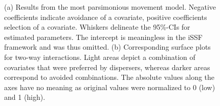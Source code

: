 \documentclass[abstract=on,10pt,a4paper,bibliography=totocnumbered]{scrartcl}
\begin{document}
\begin{figure}[hbtp]
  \begin{center}
    \caption{(a) Results from the most parsimonious movement model. Negative
    coefficients indicate avoidance of a covariate, positive coefficients
    selection of a covariate. Whiskers delineate the 95\%-CIs for estimated
    parameters. The intercept is meaningless in the iSSF framework and was thus
    omitted. (b) Corresponding surface plots for two-way interactions. Light
    areas depict a combination of covariates that were preferred by dispersers,
    whereas darker areas correspond to avoided combinations. The absolute values
    along the axes have no meaning as original values were normalized to 0 (low)
    and 1 (high).}
    \label{MovementModel}
  \end{center}
\end{figure}
\end{document}
